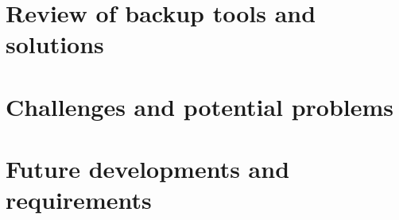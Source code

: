 \documentclass[a4paper,11pt,onecolumn]{scrartcl}
\begin{document}
\section{Review of backup tools and solutions}

\section{Challenges and potential problems}

\section{Future developments and requirements}

\nocite{*}


\end{document}
